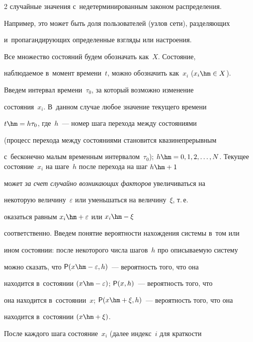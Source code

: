 \begin{multicols}{2}
случайные значения с~недетерминированным законом распределения. 


Например, это может быть доля пользователей (узлов сети), раз\-де\-ля\-ющих 


и~пропагандирующих определенные взгляды или настроения.


  


  Все множество состояний будем обозначать как~$X$. Состояние, 


наблюдаемое в~момент времени~$t$, можно обозначить как~$x_i$ ($x_i\hm\in  


{X}$).


  


  Введем интервал времени~$\tau_0$, за который возможно изменение 


состояния~$x_i$. В~данном случае любое значение текущего времени 


$t\hm=h\tau_0$, где~$h$~--- номер шага перехода между состояниями 


(процесс перехода между состояниями становится квазинепрерывным 


с~бесконечно малым временным интервалом~$\tau_0$); $h\hm=0, 1, 2, \ldots, 


N$. Текущее состояние~$x_i$ на шаге~$h$ после перехода на шаг $h\hm+1$ 


может \textit{за счет случайно возникающих факторов} увеличиваться на 


некоторую величину~$\varepsilon$ или уменьшаться на величину~$\xi$, т.\,е.\ 


оказаться равным $x_i\hm+\varepsilon$ или $x_i\hm- \xi$ 


соответственно. Введем понятие вероятности нахождения системы в~том или 


ином состоянии: после некоторого числа шагов~$h$ про описываемую систему 


можно сказать, что ${\sf P}(x\hm- \varepsilon, h)$~--- вероятность того, что она 


находится в~состоянии $(x\hm - \varepsilon)$; ${\sf P}(x,h)$~--- вероятность того, что 


она находится в~состоянии~$x$; ${\sf P}(x\hm+\xi, h)$~--- вероятность того, что она 


находится в~состоянии $(x\hm + \xi)$.


  


  После каждого шага состояние~$x_i$ (далее индекс~$i$ для краткости 



\end{multicols}
